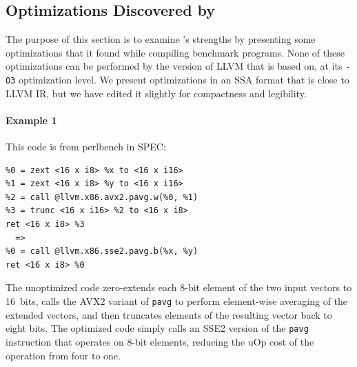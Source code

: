 \subsection{Optimizations Discovered by \minotaur}
\label{sec:examples}

The purpose of this section is to examine \minotaur's strengths by
presenting some optimizations that it found while compiling benchmark
programs.
%
None of these optimizations can be performed by the version of LLVM
that \minotaur{} is based on, at its \texttt{-O3} optimization level.
%
We present optimizations in an SSA format that is close to LLVM IR,
but we have edited it slightly for compactness and legibility.

\paragraph*{Example 1}

This code is from perlbench in SPEC:

{\begin{quoting}\begin{Verbatim}
%0 = zext <16 x i8> %x to <16 x i16>
%1 = zext <16 x i8> %y to <16 x i16>
%2 = call @llvm.x86.avx2.pavg.w(%0, %1)
%3 = trunc <16 x i16> %2 to <16 x i8>
ret <16 x i8> %3
  =>
%0 = call @llvm.x86.sse2.pavg.b(%x, %y)
ret <16 x i8> %0
\end{Verbatim}
\end{quoting}}

The unoptimized code zero-extends each 8-bit element of the two input
vectors to 16~bits, calls the AVX2 variant of \texttt{pavg} to perform
element-wise averaging of the extended vectors, and then truncates
elements of the resulting vector back to eight bits.
%
The optimized code simply calls an SSE2 version of the \texttt{pavg}
instruction that operates on 8-bit elements, reducing the uOp cost
of the operation from four to one.



